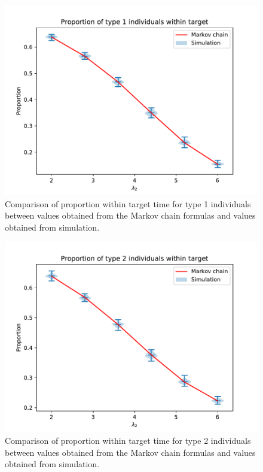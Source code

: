 \begin{figure}[H]
    \centering
    \includegraphics[width=.8\textwidth]{imgs/proportion_within_target_comparison/proportion_1.pdf}
    \caption{
        Comparison of proportion within target time for type 1 individuals 
        between values obtained from the Markov chain formulas and values 
        obtained from simulation. 
    }
    \label{fig:markov_vs_des_proportion_comparison_1}
\end{figure}

\begin{figure}[H]
    \centering
    \includegraphics[width=.8\textwidth]{imgs/proportion_within_target_comparison/proportion_2.pdf}
    \caption{
        Comparison of proportion within target time for type 2 individuals 
        between values obtained from the Markov chain formulas and values 
        obtained from simulation. 
    }
    \label{fig:markov_vs_des_proportion_comparison_2}
\end{figure}

